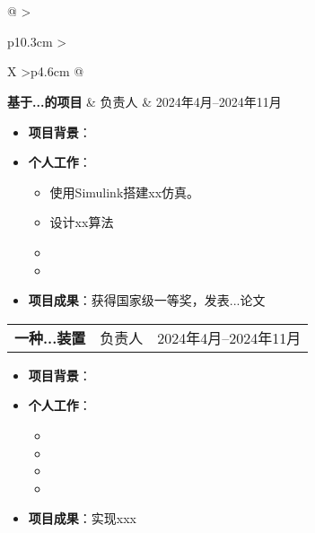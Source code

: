 \documentclass[11pt]{article}
\newlength{\iconwidth}
\begin{document}
	\begin{minipage}[t]{\textwidth}
		\section[科研经历]{}
		
		\begin{tabularx}{\linewidth}{ 
				@{}
				>{\raggedright}p{10.3cm}
				>{\raggedright}X
				>{\raggedleft}p{4.6cm}
				@{}
			}
			\textbf{基于...的项目} & 负责人 & 2024年4月--2024年11月 \\
		\end{tabularx}
		
		\vspace{-0.5cm}
		\begin{itemize}
			\item \textbf{项目背景}：
			\item \textbf{个人工作}：
			\begin{itemize}
				\item 使用Simulink搭建xx仿真。
				\item 设计xx算法
				\item 
				\item
			\end{itemize}
			\item \textbf{项目成果}：获得国家级一等奖，发表...论文
		\end{itemize}
		
		\vspace{0.3cm}
		
		\begin{tabularx}{\linewidth}{ 
				@{}
				>{\raggedright}p{10.3cm}
				>{\raggedright}X
				>{\raggedleft}p{4.6cm}
				@{}
			}
			\textbf{一种...装置} & 负责人 & 2024年4月--2024年11月 \\
		\end{tabularx}
		
		\vspace{-0.5cm}
		\begin{itemize}
			\item \textbf{项目背景}：
			\item \textbf{个人工作}：
			\begin{itemize}
				\item
				\item 
				\item 
				\item
			\end{itemize}
			\item \textbf{项目成果}：实现xxx
		\end{itemize}
		
	\end{minipage}
\end{document}
